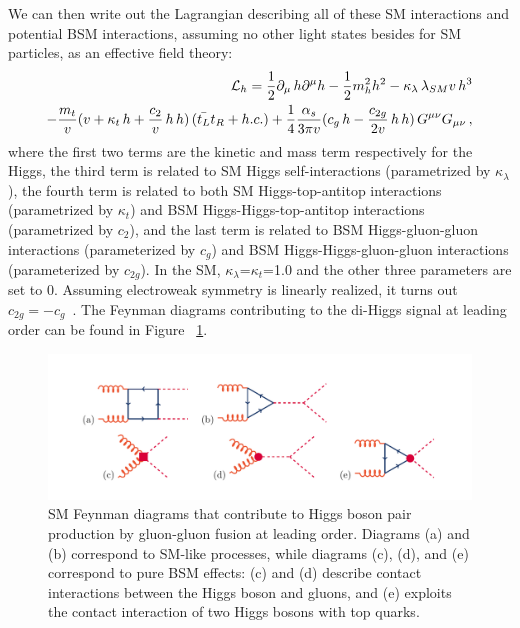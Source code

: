 We can then write out the Lagrangian describing all of these SM interactions and potential BSM interactions, assuming no other light states besides for SM particles, as an effective field theory:
\begin{eqnarray}
{\cal L}_h = 
\frac{1}{2} \partial_{\mu}\, h \partial^{\mu} h - \frac{1}{2} m_h^2 h^2 -
  {\kappa_{\lambda}}\,  \lambda_{SM} v\, h^3 \nonumber  \\ 
- \frac{ m_t}{v}(v+   {\kappa_t} \,   h  +  \frac{c_{2}}{v}   \, h\,  h ) \,( \bar{t_L}t_R + h.c.) 
+ \frac{1}{4} \frac{\alpha_s}{3 \pi v} (   c_g \, h -  \frac{c_{2g}}{2 v} \, h\, h ) \,  G^{\mu \nu}G_{\mu\nu}\,,
\label{eq:lag}
\end{eqnarray}
where the first two terms are the kinetic and mass term respectively for the Higgs, the third term is related to SM Higgs self-interactions (parametrized by $\kappa_{\lambda}$), the fourth term is related to both SM Higgs-top-antitop interactions (parametrized by $\kappa_{t}$) and BSM Higgs-Higgs-top-antitop interactions (parametrized by $c_2$), and the last term is related to BSM Higgs-gluon-gluon interactions (parameterized by $c_g$) and BSM Higgs-Higgs-gluon-gluon interactions (parameterized by $c_{2g}$). In the SM, $\kappa_{\lambda}$=$\kappa_{t}$=1.0 and the other three parameters are set to 0. Assuming electroweak symmetry is linearly realized, it turns out $c_{2g} = - c_g$~\cite{Giudice:2007fh,BUCHMULLER1986621}. The Feynman diagrams contributing to the di-Higgs signal at leading order can be found in Figure ~\ref{fig:dia}.
\begin{figure}[h]
\centering
\includegraphics[scale=0.85]{F2/translation.pdf}
\caption{SM Feynman diagrams that contribute to Higgs boson pair production by gluon-gluon fusion at leading order. Diagrams (a) and (b) correspond to SM-like processes, while diagrams (c), (d), and (e) correspond to pure BSM effects: (c) and (d) describe contact interactions between the Higgs boson and gluons, and (e) exploits the contact interaction of two Higgs bosons with top quarks.   \label{fig:dia}}
\end{figure}

